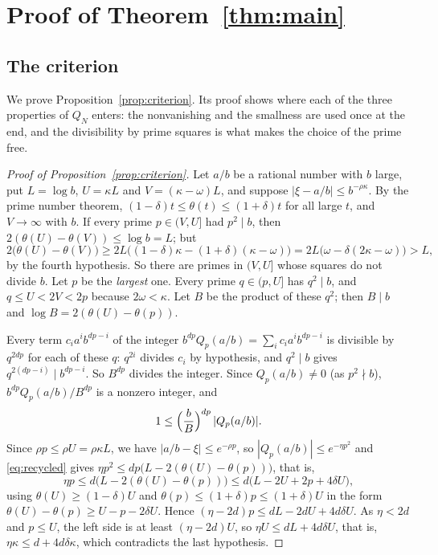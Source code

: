 \section{Proof of Theorem~\ref{thm:main}}\label{sec:proof}

\subsection{The criterion}
We prove Proposition~\ref{prop:criterion}. Its proof shows where each of the three properties of
$Q_N$ enters: the nonvanishing and the smallness are used once at the end, and the divisibility by prime
squares is what makes the choice of the prime free.

\begin{proof}[Proof of Proposition~\ref{prop:criterion}]
Let $a/b$ be a rational number with $b$ large, put $L=\log b$, $U=\kappa L$ and $V=(\kappa-\omega)L$, and
suppose $|\xi-a/b|\le b^{-\rho\kappa}$. By the prime number theorem, $(1-\delta)t\le\theta(t)\le(1+\delta)t$
for all large $t$, and $V\to\infty$ with $b$. If every prime $p\in(V,U]$ had $p^2\mid b$, then
$2(\theta(U)-\theta(V))\le\log b=L$; but
\[
 2\bigl(\theta(U)-\theta(V)\bigr)\ge2L\bigl((1-\delta)\kappa-(1+\delta)(\kappa-\omega)\bigr)
 =2L\bigl(\omega-\delta(2\kappa-\omega)\bigr)>L ,
\]
by the fourth hypothesis. So there are primes in $(V,U]$ whose squares do not divide $b$. Let $p$ be the
\emph{largest} one. Every prime $q\in(p,U]$ has $q^2\mid b$, and $q\le U<2V<2p$ because $2\omega<\kappa$.
Let $B$ be the product of these $q^2$; then $B\mid b$ and $\log B=2(\theta(U)-\theta(p))$.

Every term $c_ia^ib^{dp-i}$ of the integer $b^{dp}Q_p(a/b)=\sum_ic_ia^ib^{dp-i}$ is divisible by $q^{2dp}$ for each
of these $q$: $q^{2i}$ divides $c_i$ by hypothesis, and $q^2\mid b$ gives $q^{2(dp-i)}\mid b^{dp-i}$. So $B^{dp}$
divides the integer. Since $Q_p(a/b)\ne0$ (as $p^2\nmid b$), $b^{dp}Q_p(a/b)/B^{dp}$ is a nonzero integer, and
\begin{equation}\label{eq:recycled}
 1\le\Bigl(\frac bB\Bigr)^{dp}\,|Q_p(a/b)| .
\end{equation}
Since $\rho p\le\rho U=\rho\kappa L$, we have $|a/b-\xi|\le e^{-\rho p}$, so $|Q_p(a/b)|\le e^{-\eta p^2}$ and
\eqref{eq:recycled} gives $\eta p^2\le dp\bigl(L-2(\theta(U)-\theta(p))\bigr)$, that is,
\[
 \eta p\le d\bigl(L-2(\theta(U)-\theta(p))\bigr)\le d\bigl(L-2U+2p+4\delta U\bigr),
\]
using $\theta(U)\ge(1-\delta)U$ and $\theta(p)\le(1+\delta)p\le(1+\delta)U$ in the form
$\theta(U)-\theta(p)\ge U-p-2\delta U$. Hence $(\eta-2d)p\le dL-2dU+4d\delta U$. As $\eta<2d$ and $p\le U$,
the left side is at least $(\eta-2d)U$, so $\eta U\le dL+4d\delta U$, that is, $\eta\kappa\le d+4d\delta\kappa$,
which contradicts the last hypothesis.
\end{proof}

